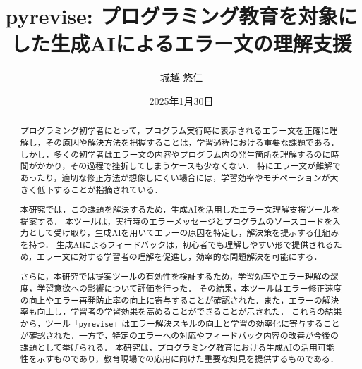 \documentclass[12pt,twoside]{jbook}
\newcommand{\pyrevise}{\texttt{pyrevise}}
\begin{document}
\title{%
  pyrevise: プログラミング教育を対象にした生成AIによるエラー文の理解支援
}


\author{%
  城越 悠仁
}

\date{2025年1月30日}






\maketitle


\begin{abstract}
  プログラミング初学者にとって，プログラム実行時に表示されるエラー文を正確に理解し，その原因や解決方法を把握することは，学習過程における重要な課題である．
  しかし，多くの初学者はエラー文の内容やプログラム内の発生箇所を理解するのに時間がかかり，その過程で挫折してしまうケースも少なくない．
  特にエラー文が難解であったり，適切な修正方法が想像しにくい場合には，学習効率やモチベーションが大きく低下することが指摘されている．

  本研究では，この課題を解決するため，生成AIを活用したエラー文理解支援ツールを提案する．
  本ツールは，実行時のエラーメッセージとプログラムのソースコードを入力として受け取り，生成AIを用いてエラーの原因を特定し，解決策を提示する仕組みを持つ．
  生成AIによるフィードバックは，初心者でも理解しやすい形で提供されるため，エラー文に対する学習者の理解を促進し，効率的な問題解決を可能にする．

  さらに，本研究では提案ツールの有効性を検証するため，学習効率やエラー理解の深度，学習意欲への影響について評価を行った．
  その結果，本ツールはエラー修正速度の向上やエラー再発防止率の向上に寄与することが確認された．また，エラーの解決率も向上し，学習者の学習効果を高めることができることが示された．
  これらの結果から，ツール「\pyrevise」はエラー解決スキルの向上と学習の効率化に寄与することが確認された．一方で，特定のエラーへの対応やフィードバック内容の改善が今後の課題として挙げられる．
  本研究は，プログラミング教育における生成AIの活用可能性を示すものであり，教育現場での応用に向けた重要な知見を提供するものである．
\end{abstract}
\end{document}
